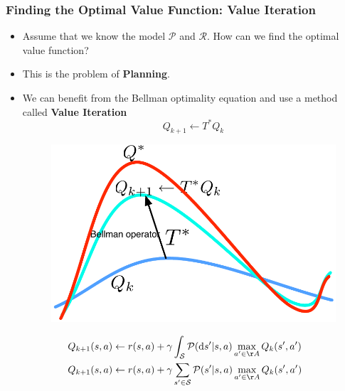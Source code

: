 \documentclass{beamer}
\newcommand{\Topt}{{T^*}}
\newcommand{\States}{\mathcal{S}}
\newcommand{\PKernel}{\mathcal{P}}
\newcommand{\RKernel}{\mathcal{R}}
\newcommand{\ds}{\mathrm{d}s}
\renewcommand{\high}{\textbf}
\begin{document}
\begin{frame}\frametitle{Finding the Optimal Value Function: Value Iteration}\small
\begin{itemize}
	\item Assume that we know the model $\PKernel$ and $\RKernel$. How can we find the optimal value function?
	\item This is the problem of \high{Planning}.
	\item We can benefit from the Bellman optimality equation and use a method called \high{Value Iteration}
		\[
			Q_{k+1} \leftarrow \Topt Q_k
		\]
	\begin{figure}
		\includegraphics[width=0.4\linewidth]{Figures/VI} 
	\end{figure}
\end{itemize}
\vspace{-0.5cm}
\begin{align*}
	&
	Q_{k+1}(s,a) \leftarrow r(s,a) + \gamma \int_{\States} \PKernel(\ds' | s,a) \max_{a' \in \AA} Q_k(s',a')
	\\
	& Q_{k+1}(s,a) \leftarrow r(s,a) + \gamma \sum_{s' \in \States} \PKernel(s' | s,a) \max_{a' \in \AA} Q_k(s',a')
\end{align*}
\end{frame}
\end{document}
